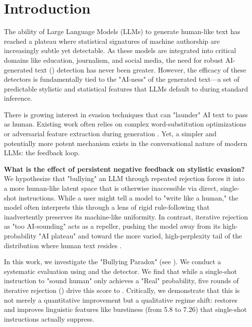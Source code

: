 \section{Introduction}
\label{sec:intro}

The ability of Large Language Models (LLMs) to generate human-like text has reached a plateau where statistical signatures of machine authorship are increasingly subtle yet detectable. As these models are integrated into critical domains like education, journalism, and social media, the need for robust AI-generated text (\AIGT) detection has never been greater. However, the efficacy of these detectors is fundamentally tied to the "AI-ness" of the generated text---a set of predictable stylistic and statistical features that LLMs default to during standard inference.

There is growing interest in evasion techniques that can "launder" AI text to pass as human. Existing work often relies on complex word-substitution optimizations \cite{lu2023sico} or adversarial feature extraction during generation \cite{zhou2024selfdisguise}. Yet, a simpler and potentially more potent mechanism exists in the conversational nature of modern LLMs: the feedback loop. 

{\bf What is the effect of persistent negative feedback on stylistic evasion?} We hypothesize that "bullying" an LLM through repeated rejection forces it into a more human-like latent space that is otherwise inaccessible via direct, single-shot instructions. While a user might tell a model to "write like a human," the model often interprets this through a lens of rigid rule-following that inadvertently preserves its machine-like uniformity. In contrast, iterative rejection as "too AI-sounding" acts as a repeller, pushing the model away from its high-probability "AI plateau" and toward the more varied, high-perplexity tail of the distribution where human text resides \cite{holtzman2019curious}.

In this work, we investigate the "Bullying Paradox" (see ). We conduct a systematic evaluation using \gptmini and the \roberta detector. We find that while a single-shot instruction to "sound human" only achieves a \singleshotacc "Real" probability, five rounds of iterative rejection (\bullying) drive this score to \roundfiveacc. Critically, we demonstrate that this is not merely a quantitative improvement but a qualitative regime shift: \bullying restores and improves linguistic features like burstiness (from 5.8 to 7.26) that single-shot instructions actually suppress.

